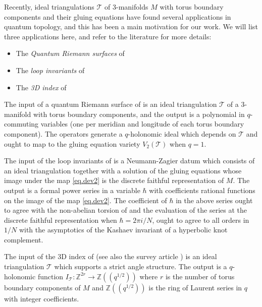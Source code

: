\documentclass[12pt]{amsart}
\theoremstyle{definition}
\numberwithin{equation}{section}
\def\BZ{\mathbb Z}
\def\longto{\longrightarrow}
\def\CT{\mathcal T}
\begin{document}
Recently, ideal triangulations $\CT$ of 3-manifolds $M$ with torus boundary 
components
and their gluing equations have found several applications
in quantum topology, and this has been a main motivation for our work. We
will list three applications here, and refer to the literature for more
details:

\begin{itemize}
\item[(a)] The {\em Quantum Riemann surfaces} of \cite{Di1}
\item[(b)] The {\em loop invariants} of \cite{DG}
\item[(c)] The {\em 3D index} of \cite{DGG1,DGG2,Ga-3Dindex}
\end{itemize}

The input of a quantum Riemann surface of \cite{Di1} is an ideal triangulation 
$\CT$ of a 3-manifold with torus boundary components, and the output is
a polynomial in $q$-commuting variables (one per meridian and longitude
of each torus boundary component). The operators generate a $q$-holonomic
ideal which depends on $\CT$ and ought to map to the gluing
equation variety $V_2(\CT)$ when $q=1$. 

The input of the loop invariants of \cite{DG} is a Neumann-Zagier datum
which consists of an ideal triangulation together with a solution of
the gluing equations whose image under the map \eqref{eq.dev2} is
the discrete faithful representation of $M$. The output is
a formal power series in a variable $\hbar$ with
coefficients rational functions on the image of the map  
\eqref{eq.dev2}. The coefficient of $\hbar$ in the above series ought to agree
with the non-abelian torsion of \cite{Porti} and the evaluation of the
series at the discrete faithful representation when $\hbar=2\pi i/N$, ought
to agree to all orders in $1/N$ with the asymptotics of the Kashaev invariant
\cite{Kashaev} of a hyperbolic knot complement.
 
The input of the 3D index of \cite{DGG1,DGG2} (see also the survey
article \cite{Ga-3Dindex}) is an ideal triangulation $\CT$ which supports
a strict angle structure. The output is a $q$-holonomic function $
I_{\CT}: \BZ^{2r} \longto \BZ((q^{1/2}))$ where $r$ is the number of torus
boundary components of $M$ and $\BZ((q^{1/2}))$ is the ring of Laurent 
series in $q$ with integer coefficients.
\end{document}
